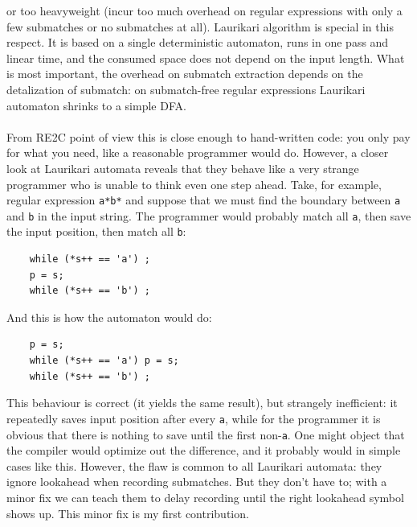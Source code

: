 \documentclass{article}
\theoremstyle{definition}
\begin{document}
\begin{multicols}{2}
or too heavyweight (incur too much overhead on regular expressions with only a few submatches or no submatches at all).
Laurikari algorithm is special in this respect.
It is based on a single deterministic automaton, runs in one pass and linear time,
and the consumed space does not depend on the input length.
What is most important, the overhead on submatch extraction depends on the detalization of submatch:
on submatch-free regular expressions Laurikari automaton shrinks to a simple DFA.
\\ \\
From RE2C point of view this is close enough to hand-written code:
you only pay for what you need, like a reasonable programmer would do.
However, a closer look at Laurikari automata reveals that
they behave like a very strange programmer who is unable to think even one step ahead.
Take, for example, regular expression \texttt{a*b*}
and suppose that we must find the boundary between \texttt{a} and \texttt{b} in the input string.
The programmer would probably match all \texttt{a}, then save the input position, then match all \texttt{b}:

\begin{small}
\begin{verbatim}
    while (*s++ == 'a') ;
    p = s;
    while (*s++ == 'b') ;
\end{verbatim}
\end{small}

And this is how the automaton would do:

\begin{small}
\begin{verbatim}
    p = s;
    while (*s++ == 'a') p = s;
    while (*s++ == 'b') ;
\end{verbatim}
\end{small}

This behaviour is correct (it yields the same result), but strangely inefficient:
it repeatedly saves input position after every \texttt{a},
while for the programmer it is obvious that there is nothing to save until the first non-\texttt{a}.
One might object that the compiler would optimize out the difference,
and it probably would in simple cases like this.
However, the flaw is common to all Laurikari automata:
they ignore lookahead when recording submatches.
But they don't have to; with a minor fix we can teach them
to delay recording until the right lookahead symbol shows up.
This minor fix is my first contribution.
\\


\end{multicols}
\end{document}
